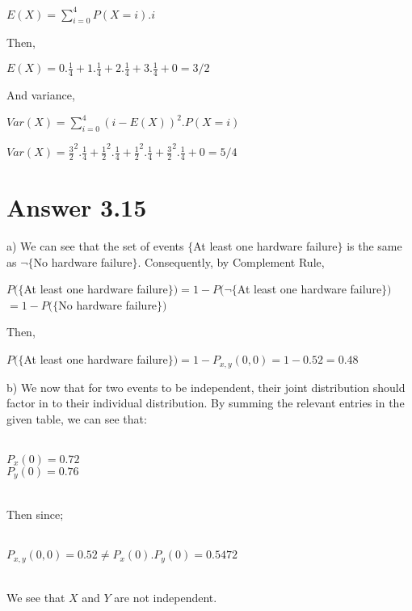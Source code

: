 \documentclass[12pt]{article}
\begin{document}
\begin{center}
$E(X)=\sum_{i=0}^4 P(X=i).i$
\end{center}
Then,
\begin{center}
$E(X)=0.\frac{1}{4}+1.\frac{1}{4}+2.\frac{1}{4}+3.\frac{1}{4}+0=3/2$
\end{center}
And variance,
\begin{center}
$Var(X)=\sum_{i=0}^4(i-E(X))^2.P(X=i)$
\end{center}
\begin{center}
$Var(X)=\frac{3}{2}^2.\frac{1}{4}+\frac{1}{2}^2.\frac{1}{4}+\frac{1}{2}^2.\frac{1}{4}+\frac{3}{2}^2.\frac{1}{4}+0=5/4$
\end{center}




\section*{Answer 3.15}
a) We can see that the set of events $\{$At least one hardware failure$\}$ is the same as $\neg \{$No hardware failure$\}$. Consequently, by Complement Rule,
\begin{center}
$P(\{$At least one hardware failure$\} )=1-P(\neg\{$At least one hardware failure$\} )$\\$=1-P( \{$No hardware failure$\})$
\end{center}
Then,
\begin{center}
$P(\{$At least one hardware failure$\} )=1-P_{x,y}(0,0)=1-0.52=0.48$
\end{center}
b) We now that for two events to be independent, their joint distribution should factor in to their individual distribution. By summing the relevant entries in the given table, we can see that:\\\\
\begin{frame}

$P_x(0)=0.72$\\
$P_y(0)=0.76$\\\\
\end{frame}
Then since;\\\\
\begin{frame}

$P_{x,y}(0,0)=0.52 \neq P_x(0).P_y(0)=0.5472$\\\\
\end{frame}
We see that $X$ and $Y$ are not independent.
\end{document}

